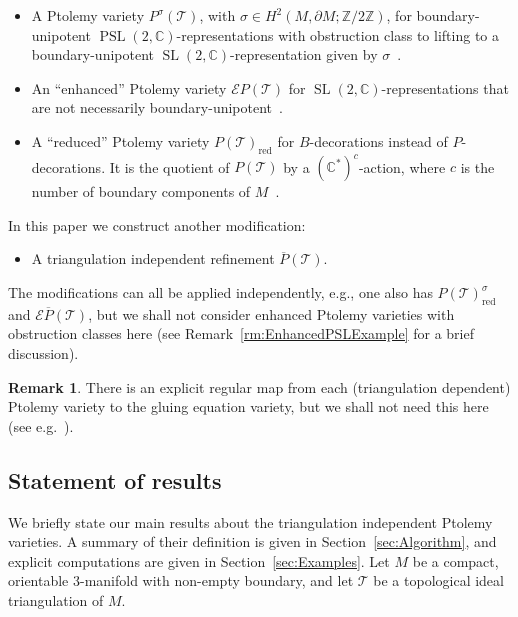 \documentclass[11pt]{amsart}
\theoremstyle{plain}
\theoremstyle{definition}
\newtheorem{remark}[theorem]{Remark}
\numberwithin{equation}{section}
\newcommand{\Z}{\mathbb Z}
\newcommand{\C}{\mathbb C}
\newcommand{\T}{\mathcal T}
\newcommand{\E}{\mathcal E}
\DeclareMathOperator{\PSL}{PSL}
\DeclareMathOperator{\SL}{SL}
\DeclareMathOperator{\red}{red}
\begin{document}
\begin{itemize}
\item A Ptolemy variety $P^\sigma(\T)$, with $\sigma\in H^2(M,\partial M;\Z/2\Z)$, for boundary-unipotent $\PSL(2,\C)$-representations with obstruction class to lifting to a boundary-unipotent $\SL(2,\C)$-represen\-tation given by $\sigma$~\cite{GaroufalidisThurstonZickert,PtolemyField}.
\item An ``enhanced'' Ptolemy variety $\E P(\T)$ for $\SL(2,\C)$-representations that are not necessarily boundary-unipotent~\cite{ZickertEnhancedPtolemy}. %
\item A ``reduced'' Ptolemy variety $P(\T)_{\red}$ for $B$-decorations instead of $P$-decorations. It is the quotient of $P(\T)$ by a $(\C^*)^c$-action, where $c$ is the number of boundary components of $M$~\cite{GaroufalidisThurstonZickert,PtolemyField}.\end{itemize} 



In this paper we construct another modification:

\begin{itemize}
\item A triangulation independent refinement $\overline P(\T)$.
\end{itemize}
The modifications can all be applied independently, e.g., one also has $P(\T)_{\red}^\sigma$ and $\E \overline P(\T)$, but we shall not consider enhanced Ptolemy varieties with obstruction classes here (see Remark~\ref{rm:EnhancedPSLExample} for a brief discussion).

\begin{remark}There is an explicit regular map from each (triangulation dependent) Ptolemy variety to the gluing equation variety, but we shall not need this here (see e.g.~\cite{GaroufalidisThurstonZickert,GaroufalidisGoernerZickert,ZickertEnhancedPtolemy}).
\end{remark}





\subsection{Statement of results} 
We briefly state our main results about the triangulation independent Ptolemy varieties. A summary of their definition is given in Section~\ref{sec:Algorithm}, and explicit computations are given in Section~\ref{sec:Examples}. Let $M$ be a compact, orientable $3$-manifold with non-empty boundary, and let $\T$ be a topological ideal triangulation of $M$.
\end{document}
